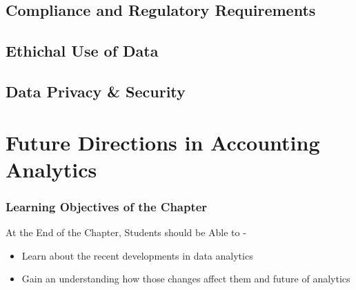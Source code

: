 \documentclass[
  letterpaper,
  DIV=11,
  numbers=noendperiod]{scrreprt}
\begin{document}
\section{Compliance and Regulatory
Requirements}\label{compliance-and-regulatory-requirements}

\section{Ethichal Use of Data}\label{ethichal-use-of-data}

\section{Data Privacy \& Security}\label{data-privacy-security}

\chapter{Future Directions in Accounting
Analytics}\label{future-directions-in-accounting-analytics}

\subsection*{Learning Objectives of the
Chapter}\label{learning-objectives-of-the-chapter-14}

\begin{tcolorbox}[enhanced jigsaw, arc=.35mm, bottomrule=.15mm, bottomtitle=1mm, breakable, colback=white, colbacktitle=quarto-callout-note-color!10!white, colframe=quarto-callout-note-color-frame, coltitle=black, left=2mm, leftrule=.75mm, opacityback=0, opacitybacktitle=0.6, rightrule=.15mm, title=\textcolor{quarto-callout-note-color}{\faInfo}\hspace{0.5em}{Learning Objectives}, titlerule=0mm, toprule=.15mm, toptitle=1mm]

At the End of the Chapter, Students should be Able to -

\begin{itemize}
\item
  Learn about the recent developments in data analytics
\item
  Gain an understanding how those changes affect them and future of
  analytics
\end{itemize}

\end{tcolorbox}
\end{document}
